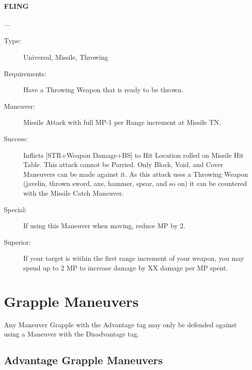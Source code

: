 \documentclass[oneside,11pt,english]{book}
\begin{document}
\paragraph{\large\label{man:FLING} FLING}---\quad{\large[???????]}
\vspace{-10pt}\begin{description} 
\item [Type:] Universal, Missile, Throwing 
\item [Requirements:] Have a Throwing Weapon that is ready to be thrown. 
\item [Maneuver:] Missile Attack with full MP-1 per Range increment at Missile TN. 
\item [Success:] Inflicts [STR+Weapon Damage+BS] to Hit Location rolled on Missile Hit Table. 
This attack cannot be Parried. Only Block, Void, and Cover Maneuvers can be made against it. 
As this attack uses a Throwing Weapon (javelin, thrown sword, axe, hammer, spear, and so on) it can be 
countered with the Missile Catch Maneuver. 
\item [Special:] If using this Maneuver when moving, reduce MP by 2. 
\item [Superior:] If your target is within the first range increment of your weapon, you may spend up to 2 MP to 
increase damage by XX damage per MP spent. 
\end{description}
\section{Grapple Maneuvers}
Any Maneuver Grapple with the Advantage tag may only be defended against using a Maneuver with the 
Disadvantage tag.

\subsection{Advantage Grapple Maneuvers}
\end{document}
